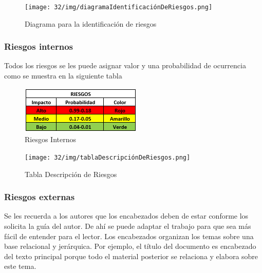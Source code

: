     \begin{figure}[H]
        \centering
        \texttt{[image: 32/img/diagramaIdentificaciónDeRiesgos.png]}
        \caption{Diagrama para la identificación de riesgos}
        \label{fig:identificacion-riesgos}
    \end{figure}
    \subsubsection{Riesgos internos}
    Todos los riesgos se les puede asignar valor y una probabilidad de ocurrencia como se muestra en la siguiente tabla

    \begin{figure}[h]
        \centering
        \includegraphics[scale=0.7]{32/img/tablaRiesgosInternos.png}
        \caption{Riesgos Internos}
        \label{fig:enter-label}
    \end{figure}
    \begin{figure}[H]
        \centering
        \texttt{[image: 32/img/tablaDescripciónDeRiesgos.png]}
        \caption{Tabla Descripción de Riesgos}
        \label{fig:enter-label}
    \end{figure}
    
    \subsubsection{Riesgos externas}
    
    Se les recuerda a los autores que los encabezados deben de estar conforme los solicita la guía del autor. De ahí se puede adaptar el trabajo para que sea más fácil de entender para el lector.
    Los encabezados organizan los temas sobre una base relacional y jerárquica. Por ejemplo, el título del documento es encabezado del texto principal porque todo el material posterior se relaciona y elabora sobre este tema. 
    
